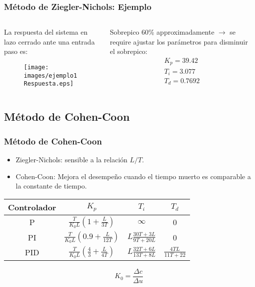 \documentclass[aspectratio=169,handout]{beamer}
\theoremstyle{definition}
\theoremstyle{plain}
\theoremstyle{remark}
\begin{document}
\begin{frame}[<+->]\frametitle{Método de Ziegler-Nichols: Ejemplo}
\vspace*{5mm}
\begin{columns}
\begin{column}{0.5\textwidth}
	La respuesta del sistema en lazo cerrado ante una entrada paso es:
	\begin{figure}
		\texttt{[image: images/ejemplo1Respuesta.eps]}
	\end{figure}
\end{column}	
\pause
\begin{column}{0.5\textwidth}
	Sobrepico 60\% approximadamente $\rightarrow$ se require ajustar los parámetros para disminuir el sobrepico:
	\begin{align*}
		K_p = 39.42\\
		T_i = 3.077\\
		T_d = 0.7692
	\end{align*}
\end{column}	
\end{columns}
\end{frame}

\subsection{Método de Cohen-Coon}
\begin{frame}[<+->]\frametitle{Método de Cohen-Coon}
  \begin{itemize}
 		\item Ziegler-Nichols: sensible a la relación $L/T$.
   	\item Cohen-Coon: Mejora el desempeño cuando el tiempo muerto es comparable a la constante de tiempo.
  \end{itemize}
  \begin{table}
  	\begin{tabular}{c|c|c|c}
  		Controlador & $K_p$ & $T_i$ & $T_d$\\
  		\hline
  		P   & $\frac{T}{K_0 L}\left(1   + \frac{L}{3T} \right)$ & $\infty$ & 0\\
  		PI  & $\frac{T}{K_0 L}\left(0.9 + \frac{L}{12T} \right)$ & $L \frac{30T+3L}{9T+20L}$ & 0\\
  		PID & $\frac{T}{K_0 L}\left(\frac{4}{3} + \frac{L}{4T} \right)$ & $L \frac{32T+6L}{13T+8L}$ & $\frac{4TL}{11T+22}$
  	\end{tabular}
  \end{table}
  \begin{equation*}
  	K_0 = \frac{\Delta c}{\Delta u}
  \end{equation*}
\end{frame}
\end{document}

